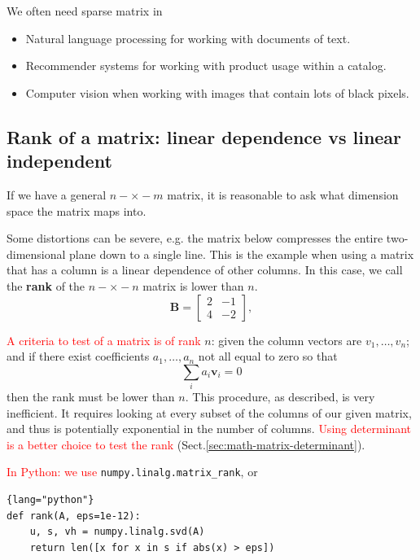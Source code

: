 We often need sparse matrix in 
\begin{itemize}	 
  \item  Natural language processing for working with documents of text.
  
  \item Recommender systems for working with product usage within a catalog.
  
  \item Computer vision when working with images that contain lots of black pixels.
\end{itemize}
 
\subsection{Rank of a matrix: linear dependence vs linear independent}
\label{sec:math-matrix-rank}

If we have a general $n-\times-m$ matrix, it is reasonable to ask what dimension
space the matrix maps into.

Some distortions can be severe, e.g. the matrix below compresses the entire
two-dimensional plane down to a single line. This is the example when using a
matrix that has a column is a linear dependence of other columns. In this case,
we call the {\bf rank} of the $n-\times-n$ matrix is lower than $n$.
\begin{equation}
\mathbf{B} = \begin{bmatrix}
2 & -1 \\ 4 & -2
\end{bmatrix},
\end{equation}


\textcolor{red}{A criteria to test of a matrix is of rank} $n$: given the column
vectors are $v_1, \ldots, v_n$; and if there exist coefficients
 $a_1, \ldots, a_n$ not all equal to zero so that
\begin{equation}
\sum_i a_i \mathbf{v}_i = 0
\end{equation}
then the rank must be lower than $n$. 
This procedure, as described, is very inefficient.
It requires looking at every subset of the columns of our given matrix,
and thus is potentially exponential in the number of columns.
\textcolor{red}{Using determinant is a better choice to test the rank} (Sect.\ref{sec:math-matrix-determinant}).

\textcolor{red}{In Python: we use} \verb!numpy.linalg.matrix_rank!, or
\begin{lstlisting}{lang="python"}
def rank(A, eps=1e-12):
    u, s, vh = numpy.linalg.svd(A)
    return len([x for x in s if abs(x) > eps])
\end{lstlisting}


